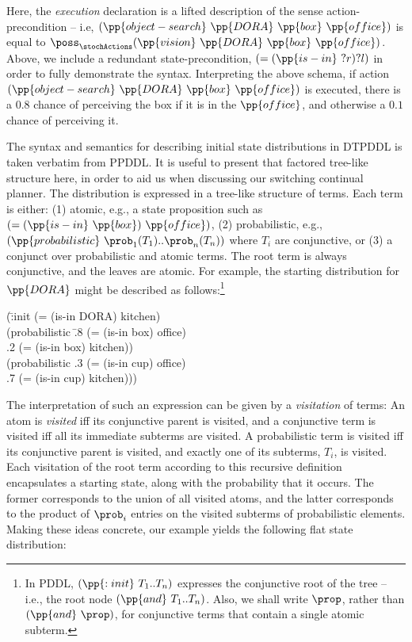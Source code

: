 \noindent Here, the {\em execution} declaration is a lifted description of
the sense action-precondition -- i.e,
$(\pp{object-search}~\pp{DORA}~\pp{box}~\pp{office})$ is equal to
$\poss_\stochActions(\pp{vision}~\pp{DORA}~\pp{box}~\pp{office})$. Above,
we include a redundant state-precondition, $(=(\pp{is-in}~?r)?l)$ in
order to fully demonstrate the syntax. Interpreting the above schema,
if action $(\pp{object-search}~\pp{DORA}~\pp{box}~\pp{office})$ is
executed, there is a $0.8$ chance of perceiving the box if it is in
the $\pp{office}$, and otherwise a $0.1$ chance of perceiving it.

The syntax and semantics for describing initial state distributions in
DTPDDL is taken verbatim from PPDDL. It is useful to present that
factored tree-like structure here, in order to aid us when discussing
our switching continual planner. The distribution is expressed in a
tree-like structure of terms. Each term is either: (1) atomic, e.g., a
state proposition such as $(=(\pp{is-in}~\pp{box})~\pp{office})$, (2)
probabilistic, e.g., $(\pp{probabilistic}~\prob_1 (T_1) .. \prob_n
(T_n))$ where $T_i$ are conjunctive, or (3) a conjunct over
probabilistic and atomic terms. The root term is always conjunctive,
and the leaves are atomic. For example, the starting distribution for
$\pp{DORA}$ might be described as follows:\footnote{In PDDL,
$(\pp{:init}~T_1..T_n)$ expresses the conjunctive root of the tree --
i.e., the root node $(\pp{and}~T_1..T_n)$. Also, we shall write
$\prop$, rather than $(\pp{and}~\prop)$, for conjunctive terms
that contain a single atomic subterm.}

\small
\begin{tabtt}
(\=:init (= (is-in DORA) kitchen) \+ \\
       (probabilistic \=.8 (= (is-in box) office)  \\
		      \>.2 (= (is-in box) kitchen)) \\
       (probabilistic .3 (= (is-in cup) office)  \\
		      \>.7 (= (is-in cup) kitchen))) \\
\end{tabtt}
\normalsize


\noindent The interpretation of such an expression can be given
by a {\em visitation} of terms: An atom is {\em visited} iff
its conjunctive parent is visited, and a conjunctive term is visited
iff all its immediate subterms are visited. A probabilistic term is
visited iff its conjunctive parent is visited, and exactly one of its
subterms, $T_i$, is visited. Each visitation of the root term
according to this recursive definition encapsulates a starting state,
along with the probability that it occurs. The former corresponds to the
union of all visited atoms, and the latter corresponds to the product
of $\prob_i$ entries on the visited subterms of probabilistic
elements. Making these ideas concrete, our example yields the
following flat state distribution:



